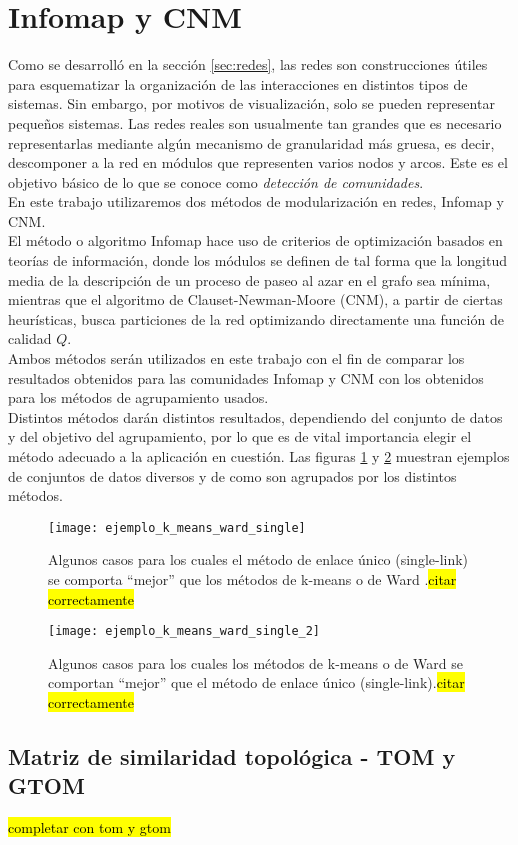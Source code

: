 \section{Infomap y CNM}
Como se desarrolló en la sección \ref{sec:redes}, las redes son construcciones útiles para esquematizar la organización de las interacciones en distintos tipos de sistemas. Sin embargo, por motivos de visualización, solo se pueden representar pequeños sistemas. Las redes reales son usualmente tan grandes que es necesario representarlas mediante algún mecanismo de granularidad más gruesa, es decir, descomponer a la red en módulos que representen varios nodos y arcos. Este es el objetivo básico de lo que se conoce como \textit{detección de comunidades}.\\
En este trabajo utilizaremos dos métodos de modularización en redes, Infomap y CNM.\\
El método o algoritmo Infomap hace uso de criterios de optimización basados en teorías de información, donde los módulos se definen de tal forma que la longitud media de la descripción de un proceso de paseo al azar en el grafo sea mínima, mientras que el algoritmo de Clauset-Newman-Moore (CNM), a partir de ciertas heurísticas, busca particiones de la red optimizando directamente una función de calidad $Q$.\\
Ambos métodos serán utilizados en este trabajo con el fin de comparar los resultados obtenidos para las comunidades Infomap y CNM con los obtenidos para los métodos de agrupamiento usados.\cite{Berenstein2014}\cite{Rosvall2008}\\
Distintos métodos darán distintos resultados, dependiendo del conjunto de datos y del objetivo del agrupamiento, por lo que es de vital importancia elegir el método adecuado a la aplicación en cuestión. Las figuras \ref{fig:ejemplo_k_means_ward_single} y \ref{fig:ejemplo_k_means_ward_single_2} muestran ejemplos de conjuntos de datos diversos y de como son agrupados por los distintos métodos.
\begin{figure}[h]
    \centering
    \texttt{[image: ejemplo\_k\_means\_ward\_single]}
    \caption{Algunos casos para los cuales el método de enlace único (single-link) se comporta ``mejor'' que los métodos de k-means o de Ward .\hl{citar correctamente}}
    \label{fig:ejemplo_k_means_ward_single}
\end{figure}

\begin{figure}[h]
    \centering
    \texttt{[image: ejemplo\_k\_means\_ward\_single\_2]}
    \caption{Algunos casos para los cuales los métodos de k-means o de Ward se comportan ``mejor'' que el método de enlace único (single-link).\hl{citar correctamente}}
    \label{fig:ejemplo_k_means_ward_single_2}
\end{figure}

\subsection{Matriz de similaridad topológica - TOM y GTOM}
\hl{completar con tom y gtom}